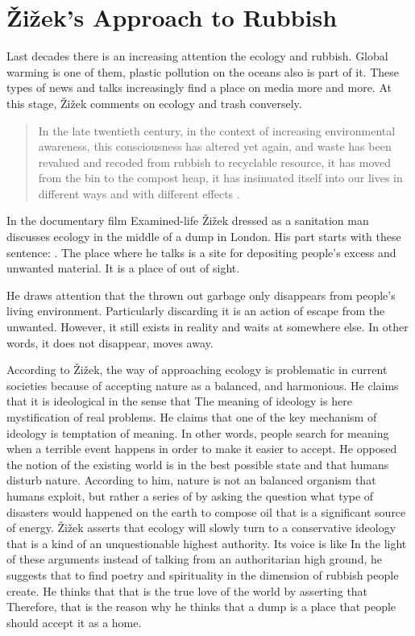 \section{Žižek’s Approach to Rubbish}
Last decades there is an increasing attention the ecology and rubbish. Global warming is one of them, plastic pollution on the oceans also is part of it. These types of news and talks increasingly find a place on media more and more. At this stage, Žižek comments on ecology and trash conversely.

\begin{quote}
In the late twentieth century, in the context of increasing environmental awareness, this consciousness has altered yet again, and waste has been revalued and recoded from rubbish to recyclable resource, it has moved from the bin to the compost heap, it has insinuated itself into our lives in different ways and with different effects \citep[5]{hawkins2005ethics}.
\end{quote}

In the documentary film Examined-life Žižek dressed as a sanitation man discusses ecology in the middle of a dump in London. His part starts with these sentence: . The place where he talks is a site for depositing people’s excess and unwanted material. It is a place of out of sight.

He draws attention that the thrown out garbage only disappears from people’s living environment. Particularly discarding it is an action of escape from the unwanted. However, it still exists in reality and waits at somewhere else. In other words, it does not disappear, moves away.

According to Žižek, the way of approaching ecology is problematic in current societies because of accepting nature as a balanced, and harmonious. He claims that it is ideological in the sense that  The meaning of ideology is here mystification of real problems. He claims that one of the key mechanism of ideology is temptation of meaning. In other words, people search for meaning when a terrible event happens in order to make it easier to accept. He opposed the notion of the existing world is in the best possible state and that humans disturb nature. According to him, nature is not an balanced organism that humans exploit, but rather a series of  by asking the question what type of disasters would happened on the earth to compose oil that is a significant source of energy. Žižek asserts that ecology will slowly turn to a conservative ideology that is a kind of an unquestionable highest authority. Its voice is like  In the light of these arguments instead of talking from an authoritarian high ground, he suggests that to find poetry and spirituality in the dimension of rubbish people create. He thinks that that is the true love of the world by asserting that  Therefore, that is the reason why he thinks that a dump is a place that people should accept it as a home. 

